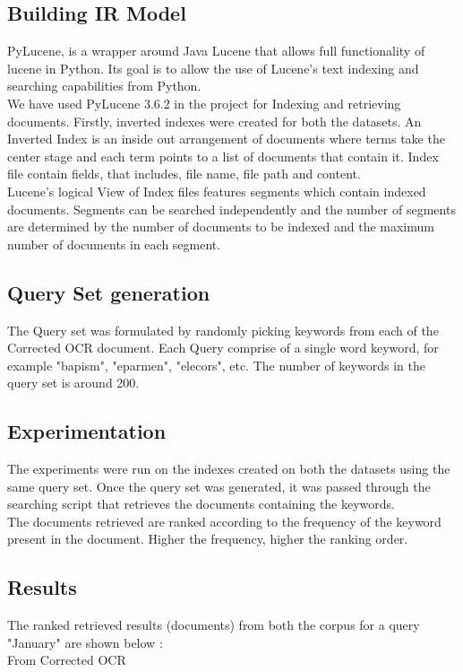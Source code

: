 \documentclass[10pt, conference, compsocconf]{IEEEtran}
\begin{document}
\subsection{Building IR Model}
PyLucene, is a wrapper around Java Lucene that allows full functionality of  lucene in Python. Its goal is to allow the use of Lucene's text indexing and searching capabilities from Python.\\
We have used PyLucene 3.6.2 in the project for Indexing and retrieving documents. Firstly, inverted indexes were created for both the datasets. An Inverted Index is an inside out arrangement of documents where terms take the center stage and each term points to a list of documents that contain it. Index file  contain fields, that includes, file name, file path and content.\\
Lucene's logical View of Index files features segments which contain indexed documents. Segments can be searched independently and the number of segments are determined by the number of documents to be indexed and the maximum number of documents in each segment.\\
\subsection{Query Set generation}
The Query set was formulated by randomly picking keywords from each of the Corrected OCR document. Each Query comprise of a single word keyword, for example "bapism", "eparmen", "elecors", etc. The number of keywords in the query set is around 200.
\subsection{Experimentation}
The experiments were run on the indexes created on both the datasets using the same query set. Once the query set was generated, it was passed through the searching script that retrieves the documents containing the keywords.\\
 The documents retrieved are ranked according to the frequency of the keyword present in the document. Higher the frequency, higher the ranking order.\\

\subsection{Results}
The ranked retrieved results (documents) from both the corpus for a query "January" are shown below : \\
From Corrected OCR \\
\end{document}
